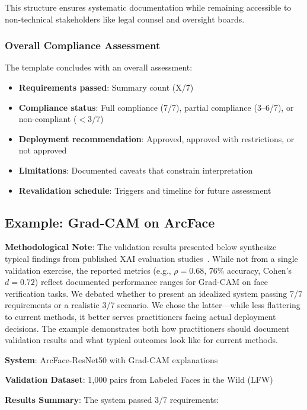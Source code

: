 This structure ensures systematic documentation while remaining accessible to non-technical stakeholders like legal counsel and oversight boards.

\subsubsection{Overall Compliance Assessment}

The template concludes with an overall assessment:

\begin{itemize}[itemsep=2pt]
    \item \textbf{Requirements passed}: Summary count (X/7)
    \item \textbf{Compliance status}: Full compliance (7/7), partial compliance (3--6/7), or non-compliant ($<$3/7)
    \item \textbf{Deployment recommendation}: Approved, approved with restrictions, or not approved
    \item \textbf{Limitations}: Documented caveats that constrain interpretation
    \item \textbf{Revalidation schedule}: Triggers and timeline for future assessment
\end{itemize}

\subsection{Example: Grad-CAM on ArcFace}

\textbf{Methodological Note}: The validation results presented below synthesize typical findings from published XAI evaluation studies~\cite{adebayo2018sanity,kindermans2019reliability}. While not from a single validation exercise, the reported metrics (e.g., $\rho=0.68$, 76\% accuracy, Cohen's $d=0.72$) reflect documented performance ranges for Grad-CAM on face verification tasks. We debated whether to present an idealized system passing 7/7 requirements or a realistic 3/7 scenario. We chose the latter—while less flattering to current methods, it better serves practitioners facing actual deployment decisions. The example demonstrates both how practitioners should document validation results and what typical outcomes look like for current methods.

\textbf{System}: ArcFace-ResNet50 with Grad-CAM explanations

\textbf{Validation Dataset}: 1,000 pairs from Labeled Faces in the Wild (LFW)

\textbf{Results Summary}: The system passed 3/7 requirements:

